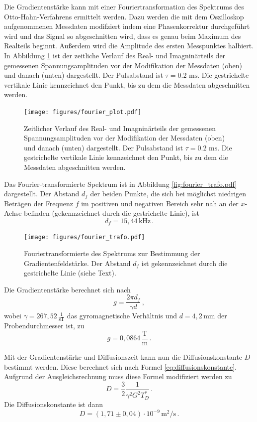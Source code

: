 Die Gradientenstärke kann mit einer Fouriertransformation
des Spektrums des Otto-Hahn-Verfahrens ermittelt werden. 
Dazu werden die mit dem Oszilloskop aufgenommenen Messdaten modifziert indem eine Phasenkorrektur durchgeführt wird und das Signal so 
abgeschnitten wird, dass es genau beim Maximum des Realteils beginnt. Außerdem wird die Amplitude des ersten
Messpunktes halbiert.
In Abbildung \ref{fig:fourier_plot} ist der zeitliche Verlauf des Real- und Imagninärteils der gemessenen 
Spannungsamplituden vor der Modifikation der Messdaten (oben) und danach (unten) dargestellt. 
Der Pulsabstand ist $\tau = 0.2 \text{ ms}$. Die gestrichelte vertikale Linie kennzeichnet den Punkt, bis zu 
dem die Messdaten abgeschnitten werden.
\begin{figure}
    \centering
    \texttt{[image: figures/fourier\_plot.pdf]}
    \caption{Zeitlicher Verlauf des Real- und Imagninärteils der gemessenen 
    Spannungsamplituden vor der Modifikation der Messdaten (oben) und danach (unten) dargestellt. 
    Der Pulsabstand ist $\tau = 0.2 \text{ ms}$. Die gestrichelte vertikale Linie kennzeichnet den Punkt, bis zu 
    dem die Messdaten abgeschnitten werden.}
    \label{fig:fourier_plot}
\end{figure}
Das Fourier-transformierte Spektrum ist in Abbildung \ref{fig:fourier_trafo.pdf} dargestellt. Der Abstand $d_f$ der 
beiden Punkte, die sich bei möglichst niedrigen Beträgen der Frequenz $f$ im positiven und negativen Bereich
sehr nah an der $x$-Achse befinden (gekennzeichnet durch die gestrichelte Linie), ist
\begin{equation*}
    d_f = 15,44 \, \text{kHz} \, .
\end{equation*}
\begin{figure}
    \centering
    \texttt{[image: figures/fourier\_trafo.pdf]}
    \caption{Fouriertransformierte des Spektrums zur Bestimmung der Gradientenfeldstärke.
    Der Abstand $d_f$ ist gekennzeichnet durch die gestrichelte Linie (siehe Text).}
    \label{fig:fourier_trafo}
\end{figure}
Die Gradientenstärke berechnet sich nach
\begin{equation*}
    g = \frac{2 \pi d_f}{\gamma d} \, ,
\end{equation*}
wobei $\gamma = 267,52 \, \frac{1}{\text{sT}}$ das gyromagnetische Verhältnis \cite{SciPy} und
$d = 4,2 \, \text{mm}$ der Probendurchmesser ist,
zu 
\begin{equation*}
    g = 0,0864 \, \frac{\text{T}}{\text{m}} \, .
\end{equation*}

Mit der Gradientenstärke und Diffusionszeit kann nun die Diffusionskonstante $D$ bestimmt werden. 
Diese berechnet sich nach Formel \ref{eq:diffusionskonstante}. Aufgrund der Ausgleichsrechnung 
muss diese Formel modifiziert werden zu 
\begin{equation*}
    D = \frac{3}{2} \frac{1}{\gamma^2 G^2 T_D^*} \, .
\end{equation*}
Die Diffusionskonstante ist dann 
\begin{equation*}
    D = (1,71 \pm 0,04) \cdot 10^{-9} \, \text{m}^2/\text{s} \, .
\end{equation*}
